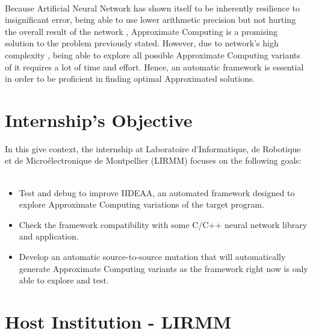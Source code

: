 ~\\
Because Artificial Neural Network has shown itself to be inherently resilience to insignificant error, being able to use lower arithmetic precision but not hurting the overall result of the network \cite{DBLP:journals/corr/SungSH15}, Approximate Computing is a promising solution to the problem previously stated. However, due to network's high complexity , being able to explore all possible Approximate Computing variants of it requires a lot of time and effort. Hence, an automatic framework is essential in order to be proficient in finding optimal Approximated solutions. \\

\section{Internship's Objective}
In this give context, the internship at Laboratoire d'Informatique, de Robotique et de Microélectronique de Montpellier (LIRMM) focuses on the following goals: ~\\
\begin{itemize}
	\item Test and debug to improve IIDEAA, an automated framework designed to explore Approximate Computing variations of the target program.
	\item Check the framework compatibility with some C/C++ neural network library and application.
	\item Develop an automatic source-to-source mutation that will automatically generate Approximate Computing variants as the framework right now is only able to explore and test. 
\end{itemize}

\section{Host Institution - LIRMM}

